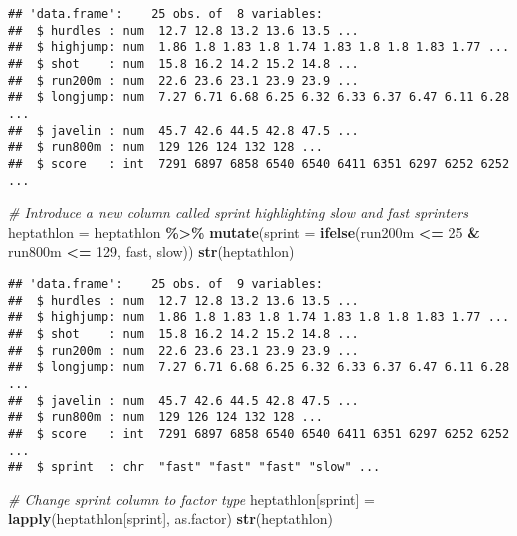 \documentclass[
]{article}
\newenvironment{Shaded}{\begin{snugshade}}{\end{snugshade}}
\newcommand{\AttributeTok}[1]{\textcolor[rgb]{0.13,0.29,0.53}{#1}}
\newcommand{\CommentTok}[1]{\textcolor[rgb]{0.56,0.35,0.01}{\textit{#1}}}
\newcommand{\DecValTok}[1]{\textcolor[rgb]{0.00,0.00,0.81}{#1}}
\newcommand{\FunctionTok}[1]{\textcolor[rgb]{0.13,0.29,0.53}{\textbf{#1}}}
\newcommand{\NormalTok}[1]{#1}
\newcommand{\OtherTok}[1]{\textcolor[rgb]{0.56,0.35,0.01}{#1}}
\newcommand{\SpecialCharTok}[1]{\textcolor[rgb]{0.81,0.36,0.00}{\textbf{#1}}}
\newcommand{\StringTok}[1]{\textcolor[rgb]{0.31,0.60,0.02}{#1}}
\begin{document}
\begin{verbatim}
## 'data.frame':    25 obs. of  8 variables:
##  $ hurdles : num  12.7 12.8 13.2 13.6 13.5 ...
##  $ highjump: num  1.86 1.8 1.83 1.8 1.74 1.83 1.8 1.8 1.83 1.77 ...
##  $ shot    : num  15.8 16.2 14.2 15.2 14.8 ...
##  $ run200m : num  22.6 23.6 23.1 23.9 23.9 ...
##  $ longjump: num  7.27 6.71 6.68 6.25 6.32 6.33 6.37 6.47 6.11 6.28 ...
##  $ javelin : num  45.7 42.6 44.5 42.8 47.5 ...
##  $ run800m : num  129 126 124 132 128 ...
##  $ score   : int  7291 6897 6858 6540 6540 6411 6351 6297 6252 6252 ...
\end{verbatim}

\begin{Shaded}
\begin{Highlighting}[]
\CommentTok{\# Introduce a new column called sprint highlighting slow and fast sprinters}
\NormalTok{heptathlon }\OtherTok{=}\NormalTok{ heptathlon }\SpecialCharTok{\%\textgreater{}\%} \FunctionTok{mutate}\NormalTok{(}\AttributeTok{sprint =} \FunctionTok{ifelse}\NormalTok{(run200m }\SpecialCharTok{\textless{}=} \DecValTok{25} \SpecialCharTok{\&}\NormalTok{ run800m }\SpecialCharTok{\textless{}=} \DecValTok{129}\NormalTok{, }\StringTok{\textquotesingle{}fast\textquotesingle{}}\NormalTok{, }\StringTok{\textquotesingle{}slow\textquotesingle{}}\NormalTok{))}
\FunctionTok{str}\NormalTok{(heptathlon)}
\end{Highlighting}
\end{Shaded}

\begin{verbatim}
## 'data.frame':    25 obs. of  9 variables:
##  $ hurdles : num  12.7 12.8 13.2 13.6 13.5 ...
##  $ highjump: num  1.86 1.8 1.83 1.8 1.74 1.83 1.8 1.8 1.83 1.77 ...
##  $ shot    : num  15.8 16.2 14.2 15.2 14.8 ...
##  $ run200m : num  22.6 23.6 23.1 23.9 23.9 ...
##  $ longjump: num  7.27 6.71 6.68 6.25 6.32 6.33 6.37 6.47 6.11 6.28 ...
##  $ javelin : num  45.7 42.6 44.5 42.8 47.5 ...
##  $ run800m : num  129 126 124 132 128 ...
##  $ score   : int  7291 6897 6858 6540 6540 6411 6351 6297 6252 6252 ...
##  $ sprint  : chr  "fast" "fast" "fast" "slow" ...
\end{verbatim}

\begin{Shaded}
\begin{Highlighting}[]
\CommentTok{\# Change sprint column to factor type}
\NormalTok{heptathlon[}\StringTok{\textquotesingle{}sprint\textquotesingle{}}\NormalTok{] }\OtherTok{=} \FunctionTok{lapply}\NormalTok{(heptathlon[}\StringTok{\textquotesingle{}sprint\textquotesingle{}}\NormalTok{], as.factor)}
\FunctionTok{str}\NormalTok{(heptathlon)}
\end{Highlighting}
\end{Shaded}
\end{document}
